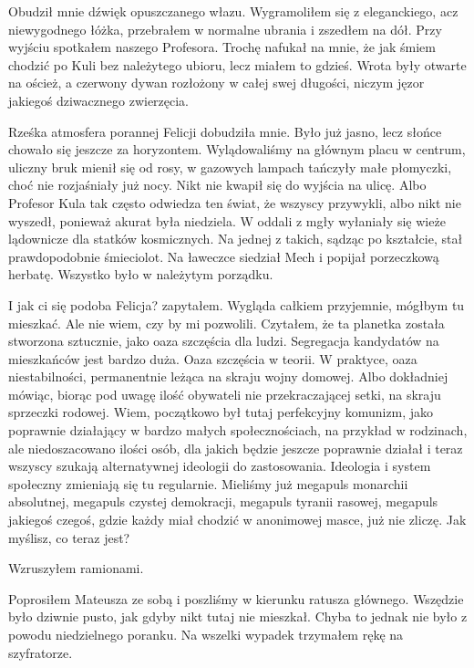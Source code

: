 Obudził mnie dźwięk opuszczanego włazu.
Wygramoliłem się z eleganckiego, acz niewygodnego łóżka, przebrałem w normalne ubrania i zszedłem na dół.
Przy wyjściu spotkałem naszego Profesora.
Trochę nafukał na mnie, że jak śmiem chodzić po Kuli bez należytego ubioru, lecz miałem to gdzieś.
Wrota były otwarte na oścież, a czerwony dywan rozłożony w całej swej długości, niczym jęzor jakiegoś dziwacznego zwierzęcia.

Rześka atmosfera porannej Felicji dobudziła mnie. Było już jasno, lecz słońce chowało się jeszcze za horyzontem.
Wylądowaliśmy na głównym placu w centrum, uliczny bruk mienił się od rosy, w gazowych lampach tańczyły małe płomyczki, choć nie rozjaśniały już nocy.
Nikt nie kwapił się do wyjścia na ulicę. Albo Profesor Kula tak często odwiedza ten świat, że wszyscy przywykli, albo nikt nie wyszedł, ponieważ akurat była niedziela.
W oddali z mgły wyłaniały się wieże lądownicze dla statków kosmicznych. Na jednej z takich, sądząc po kształcie, stał prawdopodobnie śmieciolot.
Na ławeczce siedział Mech i popijał porzeczkową herbatę.
Wszystko było w należytym porządku.
\begin{dialogue}
\ds{} I jak ci się podoba Felicja? \dm{} zapytałem.
\ds{} Wygląda całkiem przyjemnie, mógłbym tu mieszkać. Ale nie wiem, czy by mi pozwolili. Czytałem, że ta planetka została stworzona sztucznie, jako oaza szczęścia dla ludzi. 
Segregacja kandydatów na mieszkańców jest bardzo duża.
\ds{} Oaza szczęścia w teorii. W praktyce, oaza niestabilności, permanentnie leżąca na skraju wojny domowej. 
Albo dokładniej mówiąc, biorąc pod uwagę ilość obywateli nie przekraczającej setki, na skraju sprzeczki rodowej.
\ds{} Wiem, początkowo był tutaj perfekcyjny komunizm, jako poprawnie działający w bardzo małych społecznościach, na przykład w rodzinach, 
ale niedoszacowano ilości osób, dla jakich będzie jeszcze poprawnie działał i teraz wszyscy szukają alternatywnej ideologii do zastosowania.
\ds{} Ideologia i system społeczny zmieniają się tu regularnie. 
Mieliśmy już megapuls monarchii absolutnej, megapuls czystej demokracji, megapuls tyranii rasowej, megapuls jakiegoś czegoś, gdzie każdy miał chodzić w anonimowej masce, już nie zliczę.
\ds{} Jak myślisz, co teraz jest?
\end{dialogue}
Wzruszyłem ramionami.

Poprosiłem Mateusza ze sobą i poszliśmy w kierunku ratusza głównego.
Wszędzie było dziwnie pusto, jak gdyby nikt tutaj nie mieszkał. 
Chyba to jednak nie było z powodu niedzielnego poranku.
Na wszelki wypadek trzymałem rękę na szyfratorze.

